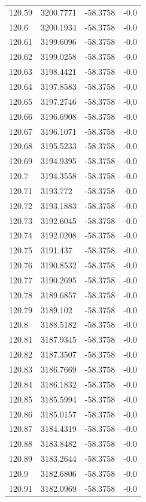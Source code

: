 \begin{table}[H]
\begin{tabular}{llll}
120.59 & 3200.7771 & -58.3758 & -0.0 \\
120.6 & 3200.1934 & -58.3758 & -0.0 \\
120.61 & 3199.6096 & -58.3758 & -0.0 \\
120.62 & 3199.0258 & -58.3758 & -0.0 \\
120.63 & 3198.4421 & -58.3758 & -0.0 \\
120.64 & 3197.8583 & -58.3758 & -0.0 \\
120.65 & 3197.2746 & -58.3758 & -0.0 \\
120.66 & 3196.6908 & -58.3758 & -0.0 \\
120.67 & 3196.1071 & -58.3758 & -0.0 \\
120.68 & 3195.5233 & -58.3758 & -0.0 \\
120.69 & 3194.9395 & -58.3758 & -0.0 \\
120.7 & 3194.3558 & -58.3758 & -0.0 \\
120.71 & 3193.772 & -58.3758 & -0.0 \\
120.72 & 3193.1883 & -58.3758 & -0.0 \\
120.73 & 3192.6045 & -58.3758 & -0.0 \\
120.74 & 3192.0208 & -58.3758 & -0.0 \\
120.75 & 3191.437 & -58.3758 & -0.0 \\
120.76 & 3190.8532 & -58.3758 & -0.0 \\
120.77 & 3190.2695 & -58.3758 & -0.0 \\
120.78 & 3189.6857 & -58.3758 & -0.0 \\
120.79 & 3189.102 & -58.3758 & -0.0 \\
120.8 & 3188.5182 & -58.3758 & -0.0 \\
120.81 & 3187.9345 & -58.3758 & -0.0 \\
120.82 & 3187.3507 & -58.3758 & -0.0 \\
120.83 & 3186.7669 & -58.3758 & -0.0 \\
120.84 & 3186.1832 & -58.3758 & -0.0 \\
120.85 & 3185.5994 & -58.3758 & -0.0 \\
120.86 & 3185.0157 & -58.3758 & -0.0 \\
120.87 & 3184.4319 & -58.3758 & -0.0 \\
120.88 & 3183.8482 & -58.3758 & -0.0 \\
120.89 & 3183.2644 & -58.3758 & -0.0 \\
120.9 & 3182.6806 & -58.3758 & -0.0 \\
120.91 & 3182.0969 & -58.3758 & -0.0 \\

\end{tabular}
\end{table}
